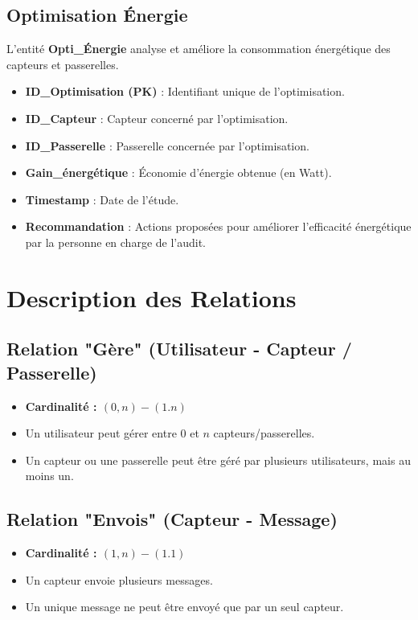 \documentclass[
	a4paper, %
	11pt, %
	unnumberedsections, %
	twoside, %
    xcolor = {dvipsnames}
]{class}
\begin{document}
\subsection{Optimisation Énergie}
L’entité \textbf{Opti\_Énergie} analyse et améliore la consommation énergétique des capteurs et passerelles.
\begin{itemize}
    \item \textbf{ID\_Optimisation (PK)} : Identifiant unique de l’optimisation.
    \item \textbf{ID\_Capteur} : Capteur concerné par l’optimisation.
    \item \textbf{ID\_Passerelle} : Passerelle concernée par l’optimisation.
    \item \textbf{Gain\_énergétique} : Économie d’énergie obtenue (en Watt).
    \item \textbf{Timestamp} : Date de l’étude.
    \item \textbf{Recommandation} : Actions proposées pour améliorer l’efficacité énergétique par la personne en charge de l'audit.
\end{itemize}

\section{Description des Relations}

\subsection{Relation "Gère" (Utilisateur - Capteur / Passerelle)}
\begin{itemize}
\item \textbf{Cardinalité : \((0,n) - (1.n)\)}
\item Un utilisateur peut gérer entre 0 et \(n\) capteurs/passerelles.
\item Un capteur ou une passerelle peut être géré par plusieurs utilisateurs, mais au moins un.
\end{itemize}

\subsection{Relation "Envois" (Capteur - Message)}
\begin{itemize}
\item \textbf{Cardinalité : \((1,n) - (1.1)\)}
\item Un capteur envoie plusieurs messages.
\item Un unique message ne peut être envoyé que par un seul capteur.
\end{itemize}
\end{document}
